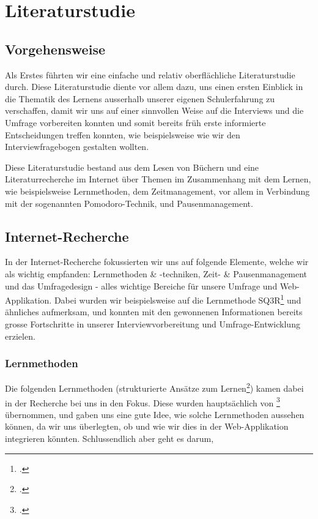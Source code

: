 \documentclass[12pt,a4paper]{report}
\begin{document}
\section{Literaturstudie}
\subsection{Vorgehensweise}
Als Erstes führten wir eine einfache und relativ oberflächliche Literaturstudie durch.
Diese Literaturstudie diente vor allem dazu, uns einen ersten Einblick in die Thematik des Lernens ausserhalb unserer eigenen Schulerfahrung zu verschaffen, damit wir uns auf einer sinnvollen Weise auf die Interviews und die Umfrage vorbereiten konnten und somit bereits früh erste informierte Entscheidungen treffen konnten, wie beispielsweise wie wir den Interviewfragebogen gestalten wollten.

Diese Literaturstudie bestand aus dem Lesen von Büchern und eine Literaturrecherche im Internet über Themen im Zusammenhang mit dem Lernen, wie beispielsweise Lernmethoden, dem Zeitmanagement, vor allem in Verbindung mit der sogenannten Pomodoro-Technik, und Pausenmanagement.


\subsection{Internet-Recherche}
In der Internet-Recherche fokussierten wir uns auf folgende Elemente, welche wir als wichtig empfanden: Lernmethoden \& -techniken, Zeit- \& Pausenmanagement und das Umfragedesign - alles wichtige Bereiche für unsere Umfrage und Web-Applikation.
Dabei wurden wir beispielsweise auf die Lernmethode SQ3R\footcite{SQ3R} und ähnliches aufmerksam, und konnten mit den gewonnenen Informationen bereits grosse Fortschritte in unserer Interviewvorbereitung und Umfrage-Entwicklung erzielen.
\subsubsection{Lernmethoden}
Die folgenden Lernmethoden (strukturierte Ansätze zum Lernen\footcite{SQ3R}) kamen dabei in der Recherche bei uns in den Fokus. 
Diese wurden hauptsächlich von \footcite{SQ3R} übernommen, und gaben uns eine gute Idee, wie solche Lernmethoden aussehen können, da wir uns überlegten, ob und wie wir dies in der Web-Applikation integrieren könnten.
Schlussendlich aber geht es darum, 
\end{document}
